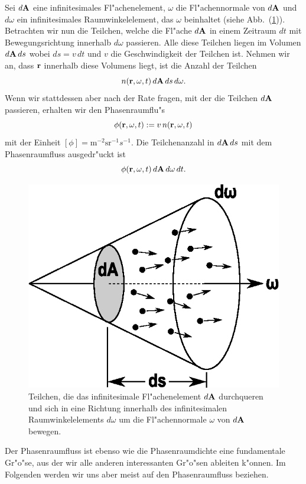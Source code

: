 	Sei $d\mathbf{A}$ eine infinitesimales Fl"achenelement, $\omega$ die Fl"achennormale von $d\mathbf{A}$ und $d\omega$ ein infinitesimales Raumwinkelelement, das $\omega$ beinhaltet (siehe Abb.~(\ref{fig:phasespacefluxsurface})). Betrachten wir nun die Teilchen, welche die Fl"ache $d\mathbf{A}$ in einem Zeitraum $dt$ mit Bewegungsrichtung innerhalb $d\omega$ passieren. Alle diese Teilchen liegen im Volumen $d\mathbf{A}\,ds$ wobei $ds=v\,dt$ und $v$ die Geschwindigkeit der Teilchen ist. Nehmen wir an, dass $\mathbf{r}$ innerhalb diese Volumens liegt, ist die Anzahl der Teilchen $$n(\mathbf{r},\omega,t)\,d\mathbf{A}\,ds\,d\omega.$$ Wenn wir stattdessen aber nach der Rate fragen, mit der die Teilchen $d\mathbf{A}$ passieren, erhalten wir den Phasenraumflu"s $$\phi(\mathbf{r},\omega,t):=v\,n(\mathbf{r},\omega,t)$$ mit der Einheit $[\phi]=\text{m}^{-2}\text{sr}^{-1}s^{-1}$. Die Teilchenanzahl in $d\mathbf{A}\,ds$ mit dem Phasenraumfluss ausgedr"uckt ist $$\phi(\mathbf{r},\omega,t)\,d\mathbf{A}\,d\omega\,dt.$$
	\begin{figure}
		\centering
		\includegraphics[height=0.3\textheight]{phasespacefluxsurface.eps}
		\caption{Teilchen, die das infinitesimale Fl"achenelement $d\mathbf{A}$ durchqueren und sich in eine Richtung innerhalb des infinitesimalen Raumwinkelelements $d\omega$ um die Fl"achennormale $\omega$ von $d\mathbf{A}$ bewegen.}
		\label{fig:phasespacefluxsurface}
	\end{figure}
	Der Phasenraumfluss ist ebenso wie die Phasenraumdichte eine fundamentale Gr"o"se, aus der wir alle anderen interessanten Gr"o"sen ableiten k"onnen. Im Folgenden werden wir uns aber meist auf den Phasenraumfluss beziehen.
		
